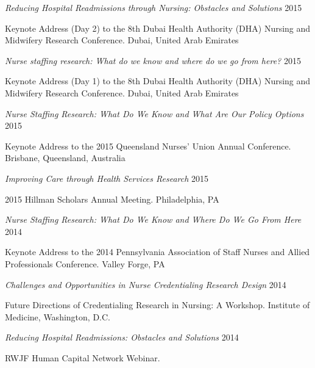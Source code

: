 \documentclass[10pt,]{article}
\begin{document}
{{{{{{{{{{{{{{{\begin{hangparas}{.5in}{1}
{\textit {Reducing Hospital Readmissions through Nursing: Obstacles and Solutions}} \hfill 2015 
\vspace{-2.5mm}
\begin{adjustwidth}{0.5cm}{1cm}
Keynote Address (Day 2) to the 8th Dubai Health Authority (DHA) Nursing and Midwifery Research Conference. Dubai, United Arab Emirates
\end{adjustwidth}

{\textit {Nurse staffing research: What do we know and where do we go from here?}} \hfill 2015 
\vspace{-2.5mm}
\begin{adjustwidth}{0.5cm}{1cm}
Keynote Address (Day 1) to the 8th Dubai Health Authority (DHA) Nursing and Midwifery Research Conference. Dubai, United Arab Emirates
\end{adjustwidth}

{\textit {Nurse Staffing Research: What Do We Know and What Are Our Policy Options}} \hfill 2015 
\vspace{-2.5mm}
\begin{adjustwidth}{0.5cm}{1cm}
Keynote Address to the 2015 Queensland Nurses’ Union Annual Conference. Brisbane, Queensland, Australia
\end{adjustwidth}

{\textit {Improving Care through Health Services Research}} \hfill 2015 
\vspace{-2.5mm}
\begin{adjustwidth}{0.5cm}{1cm}
2015 Hillman Scholars Annual Meeting. Philadelphia, PA 
\end{adjustwidth}

{\textit {Nurse Staffing Research: What Do We Know and Where Do We Go From Here}} \hfill 2014 
\vspace{-2.5mm}
\begin{adjustwidth}{0.5cm}{1cm}
Keynote Address to the 2014 Pennsylvania Association of Staff Nurses and Allied Professionals Conference. Valley Forge, PA 
\end{adjustwidth}

{\textit {Challenges and Opportunities in Nurse Credentialing Research Design}} \hfill 2014 
\vspace{-2.5mm}
\begin{adjustwidth}{0.5cm}{1cm}
Future Directions of Credentialing Research in Nursing: A Workshop. Institute of Medicine, Washington, D.C. 
\end{adjustwidth}

{\textit {Reducing Hospital Readmissions: Obstacles and Solutions}} \hfill 2014 
\vspace{-2.5mm}
\begin{adjustwidth}{0.5cm}{1cm}
RWJF Human Capital Network Webinar.
\end{adjustwidth}


\end{hangparas}}}}}}}}}}}}}}}}
\end{document}
